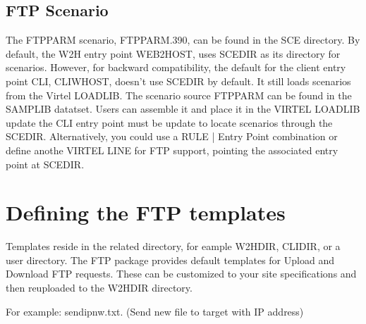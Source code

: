 \documentclass[letterpaper,10pt,english]{sphinxmanual}
\begin{document}
\subsection{FTP Scenario}
\label{\detokenize{Customization:ftp-scenario}}
\sphinxAtStartPar
The FTPPARM scenario, FTPPARM.390, can be found in the SCE directory. By default, the W2H entry point WEB2HOST, uses SCE\sphinxhyphen{}DIR as its directory for scenarios. However, for backward compatibility, the default for the client entry point CLI, CLIWHOST, doesn’t use SCE\sphinxhyphen{}DIR by default. It still loads scenarios from the Virtel LOADLIB. The scenario source FTPPARM can be found in the SAMPLIB datatset. Users can assemble it and place it in the VIRTEL LOADLIB  update the CLI entry point must be update to locate scenarios through the SCE\sphinxhyphen{}DIR. Alternatively, you could use a RULE | Entry Point combination or define anothe VIRTEL LINE for FTP support, pointing the associated entry point at SCE\sphinxhyphen{}DIR.


\section{Defining the FTP templates}
\label{\detokenize{Customization:defining-the-ftp-templates}}
\sphinxAtStartPar
Templates reside in the related directory, for eample W2H\sphinxhyphen{}DIR, CLI\sphinxhyphen{}DIR, or a user directory. The FTP package provides default templates for Upload and Download FTP requests. These can be customized to your site specifications and then re\sphinxhyphen{}uploaded to the W2H\sphinxhyphen{}DIR directory.

\sphinxAtStartPar
For example: sendipnw.txt. (Send new file to target with IP address)
\end{document}
